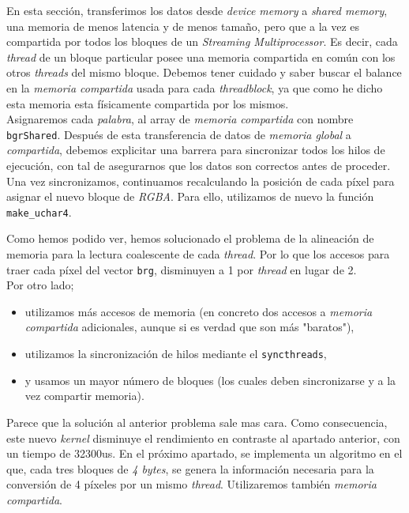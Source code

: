 \documentclass[
]{article}
\begin{document}
En esta sección, transferimos los datos desde \emph{device memory} a
\emph{shared memory}, una memoria de menos latencia y de menos tamaño,
pero que a la vez es compartida por todos los bloques de un
\emph{Streaming Multiprocessor}. Es decir, cada \emph{thread} de un
bloque particular posee una memoria compartida en común con los otros
\emph{threads} del mismo bloque. Debemos tener cuidado y saber buscar el
balance en la \emph{memoria compartida} usada para cada
\emph{threadblock}, ya que como he dicho esta memoria esta físicamente
compartida por los mismos. \\
Asignaremos cada \emph{palabra}, al array de \emph{memoria compartida}
con nombre \texttt{bgrShared}. Después de esta transferencia de datos de
\emph{memoria global} a \emph{compartida}, debemos explicitar una
barrera para sincronizar todos los hilos de ejecución, con tal de
asegurarnos que los datos son correctos antes de proceder. Una vez
sincronizamos, continuamos recalculando la posición de cada píxel para
asignar el nuevo bloque de \emph{RGBA}. Para ello, utilizamos de nuevo
la función \texttt{make\_uchar4}.

Como hemos podido ver, hemos solucionado el problema de la alineación de
memoria para la lectura coalescente de cada \emph{thread}. Por lo que
los accesos para traer cada píxel del vector \texttt{brg}, disminuyen a
1 por \emph{thread} en lugar de 2. \\
Por otro lado;

\begin{itemize}
\item
  utilizamos más accesos de memoria (en concreto dos accesos a
  \emph{memoria compartida} adicionales, aunque si es verdad que son más
  "baratos"),
\end{itemize}

\begin{itemize}
\item
  utilizamos la sincronización de hilos mediante el
  \texttt{syncthreads},
\item
  y usamos un mayor número de bloques (los cuales deben sincronizarse y
  a la vez compartir memoria).
\end{itemize}

Parece que la solución al anterior problema sale mas cara. Como
consecuencia, este nuevo \emph{kernel} disminuye el rendimiento en
contraste al apartado anterior, con un tiempo de 32300us. En el próximo
apartado, se implementa un algoritmo en el que, cada tres bloques de
\emph{4 bytes}, se genera la información necesaria para la conversión de
4 píxeles por un mismo \emph{thread}. Utilizaremos también \emph{memoria
compartida}.
\end{document}
